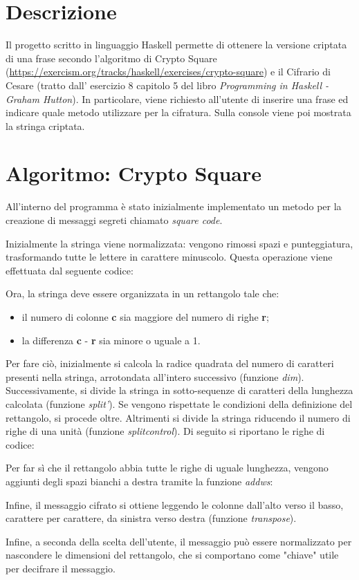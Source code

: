 \section{Descrizione}
Il progetto scritto in linguaggio Haskell permette di ottenere la versione criptata di una frase secondo l'algoritmo di Crypto Square (\url{https://exercism.org/tracks/haskell/exercises/crypto-square}) e il Cifrario di Cesare (tratto dall' esercizio 8 capitolo 5 del libro \textit{Programming in Haskell - Graham Hutton}). In particolare, viene richiesto all'utente di inserire una frase ed indicare quale metodo utilizzare per la cifratura. Sulla console viene poi mostrata la stringa criptata.

\section{Algoritmo: Crypto Square}
All'interno del programma è stato inizialmente implementato un metodo per la creazione di messaggi segreti chiamato \textit{square code}. 

Inizialmente la stringa viene normalizzata: vengono rimossi spazi e punteggiatura, trasformando tutte le lettere in carattere minuscolo. Questa operazione viene effettuata dal seguente codice:

Ora, la stringa deve essere organizzata in un rettangolo tale che:
\begin{itemize}
	\item il numero di colonne \textbf{c} sia maggiore del numero di righe \textbf{r};
	\item la differenza \textbf{c} - \textbf{r} sia minore o uguale a 1. 
\end{itemize}
Per fare ciò, inizialmente si calcola la radice quadrata del numero di caratteri presenti nella stringa, arrotondata all'intero successivo (funzione \textit{dim}). Successivamente, si divide la stringa in sotto-sequenze di caratteri della lunghezza calcolata (funzione \textit{split'}). Se vengono rispettate le condizioni della definizione del rettangolo, si procede oltre. Altrimenti si divide la stringa riducendo il numero di righe di una unità (funzione \textit{splitcontrol}). Di seguito si riportano le righe di codice:

Per far sì che il rettangolo abbia tutte le righe di uguale lunghezza, vengono aggiunti degli spazi bianchi a destra tramite la funzione \textit{addws}:

Infine, il messaggio cifrato si ottiene leggendo le colonne dall'alto verso il basso, carattere per carattere, da sinistra verso destra (funzione \textit{transpose}).

Infine, a seconda della scelta dell'utente, il messaggio può essere normalizzato per nascondere le dimensioni del rettangolo, che si comportano come "chiave" utile per decifrare il messaggio.

